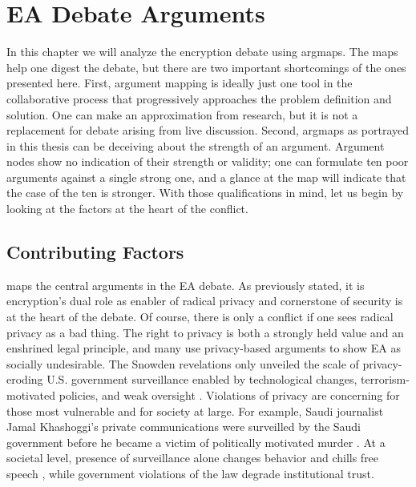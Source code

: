 \chapter{EA Debate Arguments}
\label{chap-arguments}

In this chapter we will analyze the \ac{encryption} debate using \acp{argmap}. The maps help one digest the debate, but
there are two important shortcomings of the ones presented here. First, argument mapping is ideally just one tool in the
collaborative process that progressively approaches the problem definition and solution. One can make an approximation
from research, but it is not a replacement for debate arising from live discussion. Second, \acp{argmap} as portrayed in
this thesis can be deceiving about the strength of an argument. Argument nodes show no indication of their strength or
validity; one can formulate ten poor arguments against a single strong one, and a glance at the map will indicate that
the case of the ten is stronger. With those qualifications in mind, let us begin by looking at the factors at the heart
of the conflict.


\section{Contributing Factors}
\label{sed-arg-contrib}

 maps the central arguments in the EA debate. As previously stated, it is \ac{encryption}'s dual
role as enabler of radical privacy and cornerstone of security is at the heart of the debate. Of course, there is only a
conflict if one sees radical privacy as a bad thing. The right to privacy is both a strongly held value and an enshrined
legal principle, and many use privacy-based arguments to show \ac{EA} as socially undesirable. The Snowden revelations
\cite{landau_making_2013} only unveiled the scale of privacy-eroding U.S. government surveillance enabled by
technological changes, terrorism-motivated policies, and weak oversight \cite{shamsi_2011}. Violations of privacy are
concerning for those most vulnerable and for society at large. For example, Saudi journalist Jamal Khashoggi's private
communications were surveilled by the Saudi government before he became a victim of politically motivated murder
\cite{liebermann_2019}. At a societal level, presence of surveillance alone changes behavior and chills free speech
\cite{rogaway_moral_2015}, while government violations of the law degrade institutional trust.

